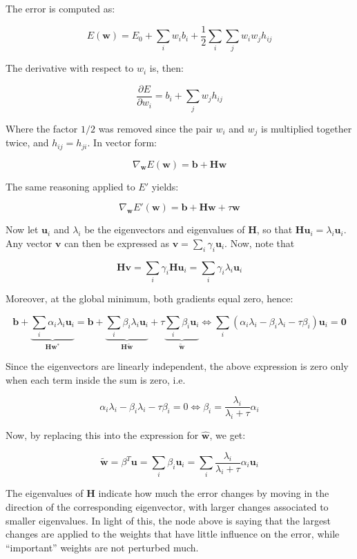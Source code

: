 \documentclass[
  a4paper,
]{article}
\begin{document}
The error is computed as:

\[
E(\textbf{w})=E_0+\sum_i w_ib_i+\frac 1 2 \sum_i\sum_j w_iw_jh_{ij}
\]

The derivative with respect to \(w_i\) is, then:

\[
\frac{\partial E}{\partial w_i}=b_i+\sum_j w_jh_{ij}
\]

Where the factor \(1/2\) was removed since the pair \(w_i\) and \(w_j\)
is multiplied together twice, and \(h_{ij}=h_{ji}\). In vector form:

\[
\nabla_{\textbf{w}} E(\textbf{w})=\textbf{b}+\textbf{H}\textbf{w}
\]

The same reasoning applied to \(E'\) yields:

\[
\nabla_{\textbf{w}} E'(\textbf{w})=\textbf{b}+\textbf{H}\textbf{w}+\tau\textbf{w}
\]

Now let \(\textbf{u}_i\) and \(\lambda_i\) be the eigenvectors and
eigenvalues of \(\textbf{H}\), so that
\(\textbf{H}\textbf{u}_i=\lambda_i\textbf{u}_i\). Any vector
\(\textbf{v}\) can then be expressed as
\(\textbf{v}=\sum_i\gamma_i\textbf{u}_i\). Now, note that

\[
\textbf{H}\textbf{v}=\sum_i\gamma_i\textbf{H}\textbf{u}_i=\sum_i\gamma_i\lambda_i\textbf{u}_i
\]

Moreover, at the global minimum, both gradients equal zero, hence:

\[
\textbf{b}+\underbrace{
  \sum_i\alpha_i\lambda_i\textbf{u}_i
}_{
  \textbf{H}\textbf{w}^*
}
=
\textbf{b}+\underbrace{
  \sum_i\beta_i\lambda_i\textbf{u}_i
}_{
  \textbf{H}\tilde{\textbf{w}}
}+\tau\underbrace{
  \sum_i\beta_i\textbf{u}_i
  }_{
    \tilde{\textbf{w}}
  }
\Longleftrightarrow
\sum_i\left( \alpha_i\lambda_i-\beta_i\lambda_i-\tau\beta_i \right)\textbf{u}_i=\textbf{0}
\]

Since the eigenvectors are linearly independent, the above expression is
zero only when each term inside the sum is zero, i.e.

\[
\alpha_i\lambda_i-\beta_i\lambda_i-\tau\beta_i=0
\Longleftrightarrow \beta_i=\frac{\lambda_i}{\lambda_i+\tau}\alpha_i
\]

Now, by replacing this into the expression for \(\hat{\textbf{w}}\), we
get:

\[
\tilde{\textbf{w}}=\beta^T\textbf{u}=\sum_i\beta_i\textbf{u}_i=\sum_i\frac{\lambda_i}{\lambda_i+\tau}\alpha_i\textbf{u}_i
\]

The eigenvalues of \(\textbf{H}\) indicate how much the error changes by
moving in the direction of the corresponding eigenvector, with larger
changes associated to smaller eigenvalues. In light of this, the node
above is saying that the largest changes are applied to the weights that
have little influence on the error, while ``important'' weights are not
perturbed much.
\end{document}
